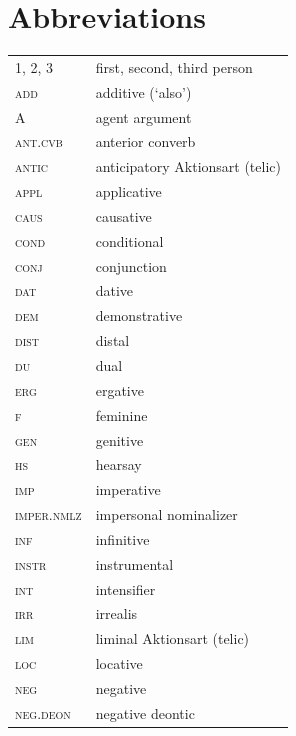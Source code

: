 \documentclass[output=paper,colorlinks,citecolor=brown]{langscibook}
\begin{document}
\section*{Abbreviations}
\begin{tabularx}{.55\textwidth}{@{}lQ@{}}
\textsc{1, 2, 3} & first, second, third person \\
\textsc{add} & additive (`also') \\
A & agent argument\\
\textsc{ant.cvb} & anterior converb \\
\textsc{antic} & anticipatory Aktionsart (telic) \\
\textsc{appl} & applicative \\
\textsc{caus} & causative \\
\textsc{cond} & conditional \\
\textsc{conj} & conjunction \\
\textsc{dat} & dative \\
\textsc{dem} & demonstrative \\
\textsc{dist} & distal \\
\textsc{du} & dual \\
\textsc{erg} & ergative \\
\textsc{f} & feminine \\
\textsc{gen} & genitive \\
\textsc{hs} & hearsay \\
\textsc{imp} & imperative \\
\textsc{imper.nmlz} & impersonal nominalizer\\
\textsc{inf} & infinitive \\
\textsc{instr} & instrumental \\
\textsc{int} & intensifier \\
\textsc{irr} & irrealis \\
\textsc{lim} & liminal Aktionsart (telic) \\
\textsc{loc} & locative \\
\textsc{neg} & negative\\
\textsc{neg.deon} & negative deontic \\\end{tabularx}%
\end{document}
